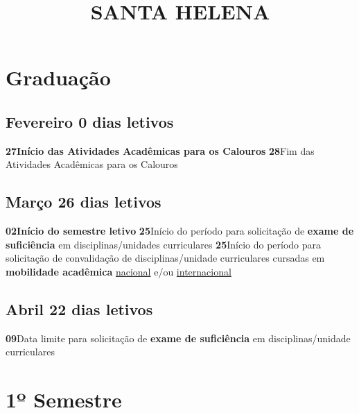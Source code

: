 \documentclass[thesis]{hmcposter}
\author{ }
\title{SANTA HELENA}
\begin{document}
\begin{poster}
\normalsize\section{\color{hmcorange}Graduação}\subsection{Fevereiro \hfill 0 dias letivos}\textbf{27}\qquad \textbf{Início das Atividades Acadêmicas para os Calouros} \newline \null\textbf{28}\qquad Fim das Atividades Acadêmicas para os Calouros \newline \null\subsection{Março \hfill 26 dias letivos}\textbf{02}\qquad \textbf{Início do semestre letivo} \newline \null\textbf{25}\qquad Início do período para solicitação de \textbf{exame de suficiência} em disciplinas/unidades curriculares \newline \null\textbf{25}\qquad Início do período para solicitação de convalidação de disciplinas/unidade curriculares cursadas em \textbf{mobilidade acadêmica} \underline{nacional} e/ou \underline{internacional} \newline \null\subsection{Abril \hfill 22 dias letivos}\textbf{09}\qquad Data limite para solicitação de \textbf{exame de suficiência} em disciplinas/unidade curriculares \newline \null\vfill\null
\columnbreak
\section{\hfill \color{hmcorange}1º Semestre}

\end{poster}
\end{document}

